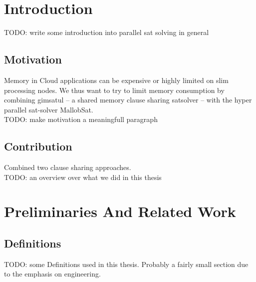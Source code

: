 \documentclass[12pt,a4paper,twoside]{scrartcl}
\numberwithin{equation}{section}
\begin{document}
\tableofcontents

\clearpage


\listoffigures
\listoftables

\clearpage


\section{Introduction}

TODO: write some introduction into parallel sat solving in general

\subsection{Motivation}

Memory in Cloud applications can be expensive or highly limited on slim processing nodes. We thus want to try to limit memory consumption by combining gimsatul -- a shared memory clause sharing satsolver -- with the hyper parallel sat-solver MallobSat.\\

TODO: make motivation a meaningfull paragraph

\subsection{Contribution}

Combined two clause sharing approaches.\\

TODO: an overview over what we did in this thesis



\section{Preliminaries And Related Work}

\subsection{Definitions}

TODO: some Definitions used in this thesis. Probably a fairly small section due to the emphasis on engineering.
\end{document}
